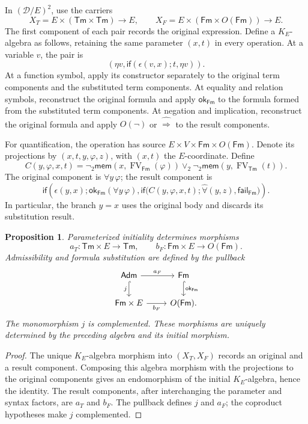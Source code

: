 \documentclass[11pt]{article}
\newtheorem{proposition}[theorem]{Proposition}
\theoremstyle{definition}\newtheorem{definition}[theorem]{Definition}
\newcommand{\Tm}{\mathsf{Tm}}
\newcommand{\Fm}{\mathsf{Fm}}
\newcommand{\FV}{\operatorname{FV}}
\newcommand{\Adm}{\mathsf{Adm}}
\newcommand{\mem}{\mathsf{mem}}
\newcommand{\ok}{\mathsf{ok}}
\newcommand{\fail}{\mathsf{fail}}
\begin{document}
In $(\mathcal D/E)^2$, use the carriers
\[
 X_T=E\times(\Tm\times\Tm)\longrightarrow E,
 \qquad
 X_F=E\times(\Fm\times O(\Fm))\longrightarrow E.
\]
The first component of each pair records the original expression.
Define a $K_E$-algebra as follows, retaining the same parameter
$(x,t)$ in every operation. At a variable $v$, the pair is
\[
 (\eta v,\mathsf{if}(\epsilon(v,x);t,\eta v)).
\]
At a function symbol, apply its constructor separately to the
original term components and the substituted term components.
At equality and relation symbols, reconstruct the original formula
and apply $\ok_{\Fm}$ to the formula formed from the substituted
term components. At negation and implication, reconstruct the
original formula and apply $O(\neg)$ or
$\widehat{\Rightarrow}$ to the result components.

For quantification, the operation has source
$E\times V\times\Fm\times O(\Fm)$.
Denote its projections by $(x,t,y,\varphi,z)$, with $(x,t)$ the
$E$-coordinate. Define
\[
 C(y,\varphi,x,t)=
 \neg_2\mem(x,\FV_{\Fm}(\varphi))
 \vee_2\neg_2\mem(y,\FV_{\Tm}(t)).
\]
The original component is $\forall y\,\varphi$; the result component is
\begin{equation}\label{eq:quantifier-fold}
 \mathsf{if}\left(\epsilon(y,x);
   \ok_{\Fm}(\forall y\,\varphi),
   \mathsf{if}\bigl(C(y,\varphi,x,t);
          \widehat\forall(y,z),\fail_{\Fm}\bigr)\right).
\end{equation}
In particular, the branch $y=x$ uses the original body and discards
its substitution result.

\begin{proposition}\label{prop:categorical-substitution}
Parameterized initiality determines morphisms
\[
 a_T:\Tm\times E\longrightarrow\Tm,
 \qquad b_F:\Fm\times E\longrightarrow O(\Fm).
\]
Admissibility and formula substitution are defined by the pullback
\[
\begin{tikzcd}
 \Adm\arrow[r,"a_F"]\arrow[d,hook,"j"'] &
 \Fm\arrow[d,hook,"\ok_{\Fm}"]\\
 \Fm\times E\arrow[r,"b_F"'] & O(\Fm).
\end{tikzcd}
\]
The monomorphism $j$ is complemented. These morphisms are uniquely
determined by the preceding algebra and its initial morphism.
\end{proposition}
\begin{proof}
The unique $K_E$-algebra morphism into $(X_T,X_F)$ records an original
and a result component. Composing this algebra morphism with the
projections to the original components gives an endomorphism of the
initial $K_E$-algebra, hence the identity. The result components,
after interchanging the parameter
and syntax factors, are $a_T$ and $b_F$. The pullback defines
$j$ and $a_F$; the coproduct hypotheses make $j$ complemented.
\end{proof}
\end{document}
